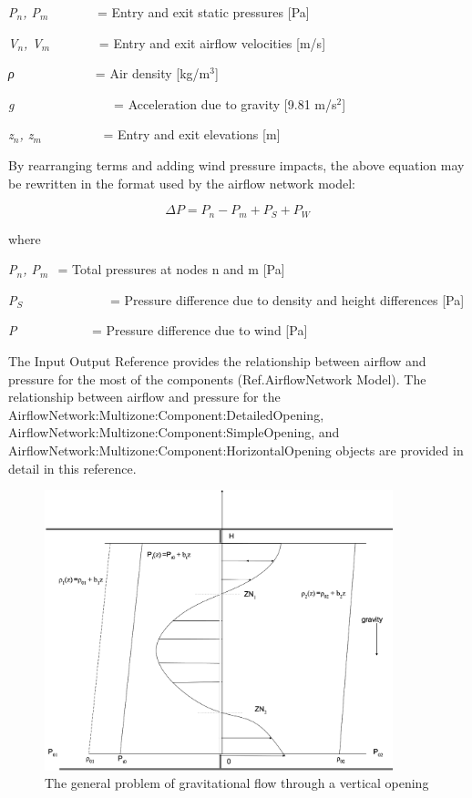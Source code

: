 \emph{P\(_{n}\), P\(_{m}\)}~~~~~~~ = Entry and exit static pressures {[}Pa{]}

\emph{V\(_{n}\), V\(_{m}\)}~~~~~~~ = Entry and exit airflow velocities {[}m/s{]}

\emph{ρ~~~}~~~~~~~~~ = Air density {[}kg/m\(^{3}\){]}

\emph{g}~~~~~~~~~~~~~~~ = Acceleration due to gravity {[}9.81 m/s\(^{2}\){]}

\emph{z\(_{n}\), z\(_{m}\)}~~~~~~~~~ = Entry and exit elevations {[}m{]}

By rearranging terms and adding wind pressure impacts, the above equation may be rewritten in the format used by the airflow network model:

\begin{equation}
\Delta P = {P_n} - {P_m} + {P_S} + {P_W}
\end{equation}

where

\emph{P\(_{n}\), P\(_{m}\)} \(_{ }\) = Total pressures at nodes n and m {[}Pa{]}

\emph{P\(_{S}\)}~~~~~~~~~~~~~ = Pressure difference due to density and height differences {[}Pa{]}

\emph{P\(_{ }\)}~~~~~~~~~~~ = Pressure difference due to wind {[}Pa{]}

The Input Output Reference provides the relationship between airflow and pressure for the most of the components (Ref.AirflowNetwork Model). The relationship between airflow and pressure for the AirflowNetwork:Multizone:Component:DetailedOpening, AirflowNetwork:Multizone:Component:SimpleOpening, and \\ AirflowNetwork:Multizone:Component:HorizontalOpening objects are provided in detail in this reference.

\begin{figure}[hbtp] %
\centering
\includegraphics[width=0.9\textwidth, height=0.9\textheight, keepaspectratio=true]{media/image2691.svg.png}
\caption{The general problem of gravitational flow through a vertical opening \protect \label{fig:the-general-problem-of-gravitational-flow}}
\end{figure}

